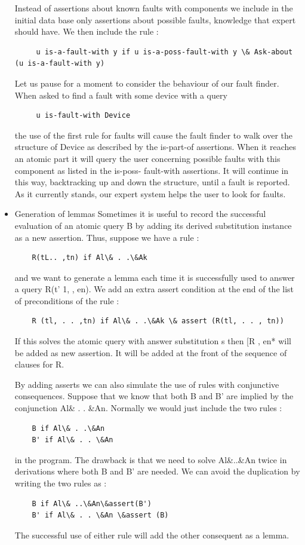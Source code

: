 \documentclass[14pt]{article}
\begin{document}
\begin{itemize}
Instead of assertions about known faults with components we include in 
the initial data base only assertions about possible faults, knowledge 
that expert should have. We then include the rule :
\begin{verbatim}
	 u is-a-fault-with y if u is-a-poss-fault-with y \& Ask-about (u is-a-fault-with y) 
\end{verbatim}
Let us pause for a moment to consider the behaviour of our fault finder. When asked to find a fault with some device with a query
\begin{verbatim}
	 u is-fault-with Device
\end{verbatim}
the use of the first rule for faults will cause the fault finder to walk over the structure of Device as described by the is-part-of assertions. When it reaches an atomic part it will query the user concerning possible faults with this component as listed in the is-poss- fault-with assertions. It will continue in this way, backtracking up and down the structure, until a fault is reported. As it currently stands, our expert system helps the user to look for faults. 

\item Generation of lemmas 
Sometimes it is useful to record the successful evaluation of an atomic 
query B by adding its derived substitution instance as a new assertion. Thus, suppose we have a rule :
\begin{verbatim}
	R(tL.. ,tn) if Al\& . .\&Ak 
\end{verbatim}
and we want to generate a lemma each time it is successfully used to 
answer a query R(t' 1, , en). We add an extra assert condition at the 
end of the list of preconditions of the rule :
\begin{verbatim}
	R (tl, . . ,tn) if Al\& . .\&Ak \& assert (R(tl, . . , tn))
\end{verbatim}
If this solves the atomic query with answer substitution s then [R , en* will be added as new assertion. It will be added at the front of the sequence of clauses for R.

By adding asserts we can also simulate the use of rules with 
conjunctive consequences. Suppose that we know that both B and B' are implied by the conjunction Al\& . . \&An. Normally we would just include the two rules : 
\begin{verbatim}
	B if Al\& . .\&An
	B' if Al\& . . \&An 
\end{verbatim}
in the program. The drawback is that we need to solve Al\&..\&An twice in 
derivations where both B and B' are needed. We can avoid the duplication by writing the two rules as :
\begin{verbatim}
	B if Al\& ..\&An\&assert(B') 
	B' if Al\& . . \&An \&assert (B) 
\end{verbatim}
The successful use of either rule will add the other consequent as a lemma. 


\end{itemize}
\end{document}
